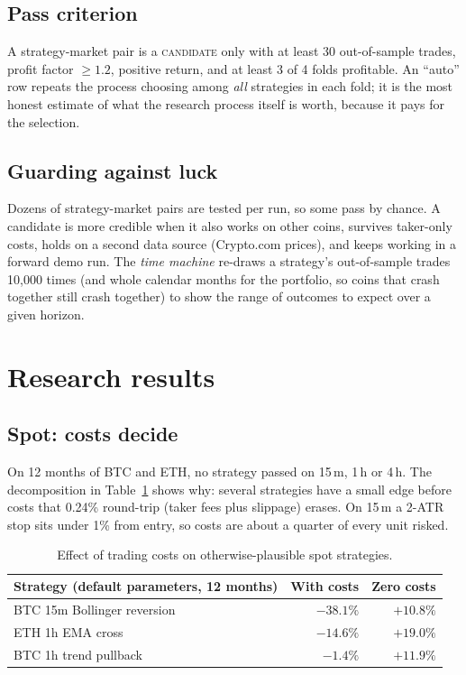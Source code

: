 \documentclass[11pt,a4paper]{article}
\begin{document}
\subsection{Pass criterion}
A strategy-market pair is a \textsc{candidate} only with at least 30 out-of-sample trades, profit
factor $\ge 1.2$, positive return, and at least 3 of 4 folds profitable. An ``auto'' row repeats
the process choosing among \emph{all} strategies in each fold; it is the most honest estimate of
what the research process itself is worth, because it pays for the selection.

\subsection{Guarding against luck}
Dozens of strategy-market pairs are tested per run, so some pass by chance. A candidate is more
credible when it also works on other coins, survives taker-only costs, holds on a second data
source (Crypto.com prices), and keeps working in a forward demo run. The \emph{time machine}
re-draws a strategy's out-of-sample trades 10{,}000 times (and whole calendar months for the
portfolio, so coins that crash together still crash together) to show the range of outcomes to
expect over a given horizon.

\section{Research results}
\subsection{Spot: costs decide}\label{sec:spot-research}
On 12 months of BTC and ETH, no strategy passed on 15\,m, 1\,h or 4\,h. The decomposition in
Table~\ref{tab:costs} shows why: several strategies have a small edge before costs that 0.24\%
round-trip (taker fees plus slippage) erases. On 15\,m a 2-ATR stop sits under 1\% from entry, so
costs are about a quarter of every unit risked.

\begin{table}[h]
\centering\small
\begin{tabular}{@{}lrr@{}}
\toprule
Strategy (default parameters, 12 months) & With costs & Zero costs \\
\midrule
BTC 15m Bollinger reversion & $-38.1\%$ & $+10.8\%$ \\
ETH 1h EMA cross & $-14.6\%$ & $+19.0\%$ \\
BTC 1h trend pullback & $-1.4\%$ & $+11.9\%$ \\
\bottomrule
\end{tabular}
\caption{Effect of trading costs on otherwise-plausible spot strategies.}\label{tab:costs}
\end{table}
\end{document}
